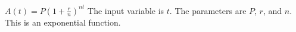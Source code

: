 {$A(t)=P(1+\frac{r}{n})^{nt}$}
{The input variable is $t$. The parameters are $P$, $r$, and $n$. This is an exponential function.}
